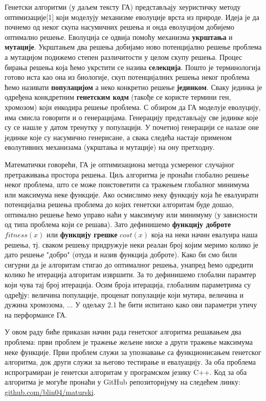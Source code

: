 \documentclass{article}
\begin{document}
Генетски алгоритми (у даљем тексту ГА) представљају хеуристичку методу оптимизације[1] који моделују
механизме еволуције врста из природе. Идеја је да почнемо од неког скупа насумичних решења и онда
еволуцијом добијемо оптимално решење. Еволуција се одвија помоћу механизма \textbf{укрштања}
и \textbf{мутације}. Укрштањем два решења добијамо ново потенцијално решење проблема а мутацијом
подижемо степен различитости у целом скупу решења. Процес бирања решења која ћемо укрстити се назива 
\textbf{селекција}. Пошто је терминологија готово иста као она из биологије, скуп потенцијалних 
решења неког проблема ћемо називати \textbf{популацијом} а неко конкретно решење \textbf{јединком}. 
Сваку јединка је одређена конкдретним \textbf{генетским кодм} (такође се користе термини ген, хромозом) који енкодира 
решење проблема. С обзиром да  ГА моделује еволуцију, има смисла говорити и о генерацијама. Генерацију 
представљају све јединке које су се нашле у датом тренутку у популацији. У почетној генерацији се 
налазе оне јединке које су насумично генерисане, а свака следећа настаје применом еволутивних 
механизама (укрштања и мутације) на ону претходну. 

Математички говорећи, ГА је оптимизациона метода усмереног случајног претраживања
простора решења. Циљ алгоритма је пронаћи глобално решење неког проблема, што се 
може поистоветити са тражењем глобалног минимума или максимума неке функције. Ако
осмислимо неку функцију која ће евалуирати потенцијална решења проблема до којих 
генетски алгоритам буде дошао, оптимално решење ћемо управо наћи у максимуму или
минимуму (у зависности од типа проблема који се решава). Зато дефинишемо \textbf{функцију доброте}
$fitness(x)$ или \textbf{функцију грешке} $cost(x)$ која на неки начин евалуира наша решења, 
тј. сваком решењу придружује неки реалан број којим меримо колико је дато решење "добро"
(отуда и назив функција доброте). Како би смо били сигурни да је алгоритам стигао до
оптималног решења, унапред ћемо одредити колико ће итерација алгоритам извршити. За то
дефинишемо глобални парамтер који чува тај број итерација. Осим броја итерација, глобалним 
параметрима су одређју: величина популације, проценат популације који мутира, величина и дужина хромозома,
... У одељку 2.1 ће бити испитано како ови параметри утичу на перформансе ГА.

У овом раду биће приказан начин рада генетског алгоритма решавањем два проблема: први проблем
је тражење жељене ниске а други тражење максимума неке функције. Први проблем служи за 
упознавање са функционисањем генетског алгоритма, док други служи за његово тестирање и 
евалуацију. За оба проблема испрограмиран је генетски алгоритам у програмском језику 
C++. Код за оба алгоритма је могуће пронаћи у GitHub репозиторијуму на следећем
линку: \url{github.com/blin04/maturski}.
\end{document}
